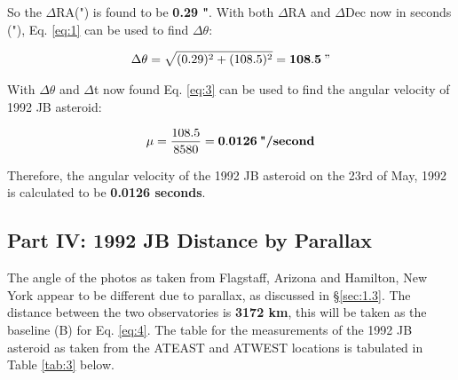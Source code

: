 \documentclass[12pt]{article}
\begin{document}
So the $\Delta$RA(") is found to be \textbf{0.29 "}. With both $\Delta$RA and $\Delta$Dec now in seconds ("), Eq. \ref{eq:1} can be used to find $\Delta \theta$:

\vspace{-2ex}
\begin{gather*}
    \Delta \theta = \sqrt{(0.29)^2 + (108.5)^2} = \mathbf{108.5} \: "
\end{gather*}

With $\Delta \theta$ and $\Delta$t now found Eq. \ref{eq:3} can be used to find the angular velocity of 1992 JB asteroid:

\vspace{-2ex}
\begin{gather*}
    \mu = \frac{108.5}{8580} = \mathbf{0.0126} \: \text{\textbf{"/second}} 
\end{gather*}

Therefore, the angular velocity of the 1992 JB asteroid on the 23rd of May, 1992 is calculated to be \textbf{0.0126 seconds}.

\subsection{Part IV: 1992 JB Distance by Parallax}

The angle of the photos as taken from Flagstaff, Arizona and Hamilton, New York appear to be different due to parallax, as discussed in §\ref{sec:1.3}. The distance between the two observatories is \textbf{3172 km}, this will be taken as the baseline (B) for Eq. \ref{eq:4}.
The table for the measurements of the 1992 JB asteroid as taken from the ATEAST and ATWEST locations is tabulated in Table \ref{tab:3} below.

\begin{table}[H]
    \centering
    \caption{Table of coordinate measurements for 1992 JB asteroid for ATEAST and ATWEST.}
    \label{tab:3}
\end{table}
\end{document}
